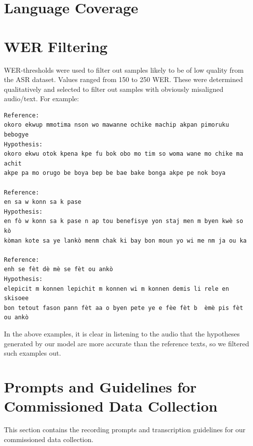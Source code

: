 \section{\OmniASR Language Coverage}
\label{sec:appending}



\section{WER Filtering}
\label{sec:appendix_wer_filtering}

WER-thresholds were used to filter out samples likely to be of low quality from the \vendorcorpus{} ASR dataset. Values ranged from 150 to 250 WER. These were determined qualitatively and selected to filter out samples with obviously misaligned audio/text. For example:

\hfill

\begin{verbatim}
Reference:
okoro ekwup mmotima nson wo mawanne ochike machip akpan pimoruku bebogye
Hypothesis:
okoro ekwu otok kpena kpe fu bok obo mo tim so woma wane mo chike ma achit
akpe pa mo orugo be boya bep be bae bake bonga akpe pe nok boya

Reference:
en sa w konn sa k pase
Hypothesis:
en fò w konn sa k pase n ap tou benefisye yon staj men m byen kwè so kò
kòman kote sa ye lankò menm chak ki bay bon moun yo wi me nm ja ou ka

Reference:
enh se fèt dè mè se fèt ou ankò
Hypothesis:
elepicit m konnen lepichit m konnen wi m konnen demis li rele en skisoee
bon tetout fason pann fèt aa o byen pete ye e fèe fèt b  èmè pis fèt ou ankò
\end{verbatim}

\hfill

In the above examples, it is clear in listening to the audio that the hypotheses generated by our model are more accurate than the reference texts, so we filtered such examples out.

\section{Prompts and Guidelines for Commissioned Data Collection}
This section contains the recording prompts and transcription guidelines for our commissioned data collection.
